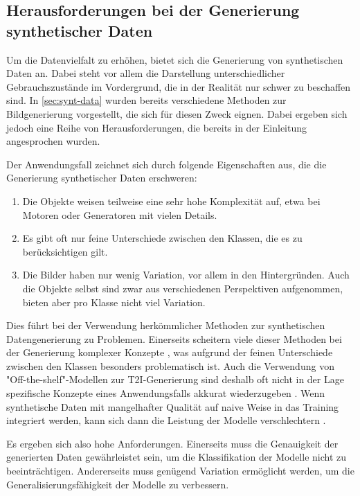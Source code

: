 \subsection{Herausforderungen bei der Generierung synthetischer Daten} \label{subsec:challenges-synt-data}

Um die Datenvielfalt zu erhöhen, bietet sich die Generierung von synthetischen Daten an. Dabei steht vor allem die Darstellung unterschiedlicher Gebrauchszustände im Vordergrund, die in der Realität nur schwer zu beschaffen sind. In \autoref{sec:synt-data} wurden bereits verschiedene Methoden zur Bildgenerierung vorgestellt, die sich für diesen Zweck eignen. Dabei ergeben sich jedoch eine Reihe von Herausforderungen, die bereits in der Einleitung angesprochen wurden.

Der Anwendungsfall zeichnet sich durch folgende Eigenschaften aus, die die Generierung synthetischer Daten erschweren:

\begin{enumerate}
	\item Die Objekte weisen teilweise eine sehr hohe Komplexität auf, etwa bei Motoren oder Generatoren mit vielen Details. 
	\item Es gibt oft nur feine Unterschiede zwischen den Klassen, die es zu berücksichtigen gilt.
	\item Die Bilder haben nur wenig Variation, vor allem in den Hintergründen. Auch die Objekte selbst sind zwar aus verschiedenen Perspektiven aufgenommen, bieten aber pro Klasse nicht viel Variation.
\end{enumerate}

Dies führt bei der Verwendung herkömmlicher Methoden zur synthetischen Datengenerierung zu Problemen. Einerseits scheitern viele dieser Methoden bei der Generierung komplexer Konzepte \parencite{Lu2024syntheticdatareview}, was aufgrund der feinen Unterschiede zwischen den Klassen besonders problematisch ist. Auch die Verwendung von "Off-the-shelf"-Modellen zur T2I-Generierung sind deshalb oft nicht in der Lage spezifische Konzepte eines Anwendungsfalls akkurat wiederzugeben \parencite{Fan2023scalingsyntheticimages}. Wenn synthetische Daten mit mangelhafter Qualität auf naive Weise in das Training integriert werden, kann sich dann die Leistung der Modelle verschlechtern \parencite{VanBreugel2023syntheticdatarealerrors}.

Es ergeben sich also hohe Anforderungen. Einerseits muss die Genauigkeit der generierten Daten gewährleistet sein, um die Klassifikation der Modelle nicht zu beeinträchtigen. Andererseits muss genügend Variation ermöglicht werden, um die Generalisierungsfähigkeit der Modelle zu verbessern.

